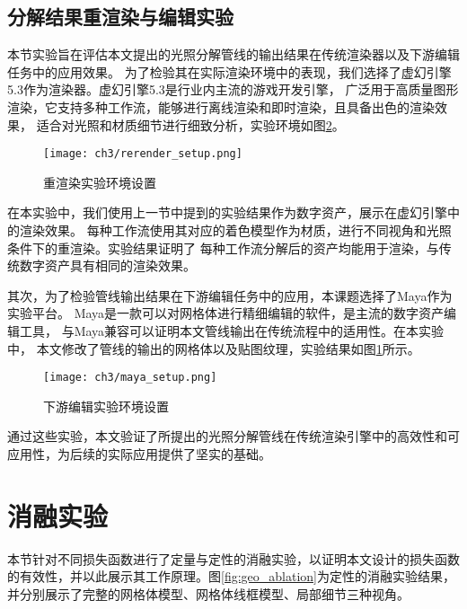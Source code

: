 \subsection{分解结果重渲染与编辑实验}

本节实验旨在评估本文提出的光照分解管线的输出结果在传统渲染器以及下游编辑任务中的应用效果。
为了检验其在实际渲染环境中的表现，我们选择了虚幻引擎5.3作为渲染器。虚幻引擎5.3是行业内主流的游戏开发引擎，
广泛用于高质量图形渲染，它支持多种工作流，能够进行离线渲染和即时渲染，且具备出色的渲染效果，
适合对光照和材质细节进行细致分析，实验环境如图\ref{fig:rerender_setup}。

\begin{figure}[htb]
  \centering
  \texttt{[image: ch3/rerender\_setup.png]}
  \caption{重渲染实验环境设置}
  \label{fig:rerender_setup}
\end{figure}

在本实验中，我们使用上一节中提到的实验结果作为数字资产，展示在虚幻引擎中的渲染效果。
每种工作流使用其对应的着色模型作为材质，进行不同视角和光照条件下的重渲染。实验结果证明了
每种工作流分解后的资产均能用于渲染，与传统数字资产具有相同的渲染效果。

其次，为了检验管线输出结果在下游编辑任务中的应用，本课题选择了Maya作为实验平台。
Maya是一款可以对网格体进行精细编辑的软件，是主流的数字资产编辑工具，
与Maya兼容可以证明本文管线输出在传统流程中的适用性。在本实验中，
本文修改了管线的输出的网格体以及贴图纹理，实验结果如图\ref{}所示。

\begin{figure}[htb]
  \centering
  \texttt{[image: ch3/maya\_setup.png]}
  \caption{下游编辑实验环境设置}
  \label{fig:rerender_setup}
\end{figure}

通过这些实验，本文验证了所提出的光照分解管线在传统渲染引擎中的高效性和可应用性，为后续的实际应用提供了坚实的基础。

\section{消融实验}

本节针对不同损失函数进行了定量与定性的消融实验，以证明本文设计的损失函数的有效性，并以此展示其工作原理。图\ref{fig:geo_ablation}为定性的消融实验结果，并分别展示了完整的网格体模型、网格体线框模型、局部细节三种视角。

